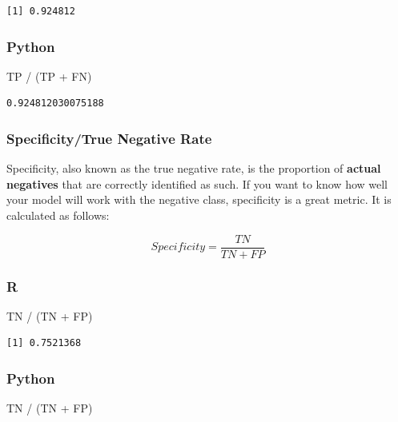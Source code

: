 \documentclass[
  letterpaper,
]{krantz}
\newenvironment{Shaded}{}{}
\newcommand{\NormalTok}[1]{#1}
\newcommand{\OperatorTok}[1]{\textcolor[rgb]{0.40,0.40,0.40}{#1}}
\newcommand{\SpecialCharTok}[1]{\textcolor[rgb]{0.25,0.44,0.63}{#1}}
\begin{document}
\begin{verbatim}
[1] 0.924812
\end{verbatim}

\subsubsection{Python}

\begin{Shaded}
\begin{Highlighting}[]
\NormalTok{TP }\OperatorTok{/}\NormalTok{ (TP }\OperatorTok{+}\NormalTok{ FN)}
\end{Highlighting}
\end{Shaded}

\begin{verbatim}
0.924812030075188
\end{verbatim}

\subsubsection{Specificity/True Negative
Rate}\label{specificitytrue-negative-rate}

Specificity, also known as the true negative rate, is the proportion of
\textbf{actual negatives} that are correctly identified as such. If you
want to know how well your model will work with the negative class,
specificity is a great metric. It is calculated as follows:

\[Specificity = \frac{TN}{TN + FP}\]

\subsubsection{R}

\begin{Shaded}
\begin{Highlighting}[]
\NormalTok{TN }\SpecialCharTok{/}\NormalTok{ (TN }\SpecialCharTok{+}\NormalTok{ FP)}
\end{Highlighting}
\end{Shaded}

\begin{verbatim}
[1] 0.7521368
\end{verbatim}

\subsubsection{Python}

\begin{Shaded}
\begin{Highlighting}[]
\NormalTok{TN }\OperatorTok{/}\NormalTok{ (TN }\OperatorTok{+}\NormalTok{ FP)}
\end{Highlighting}
\end{Shaded}
\end{document}

